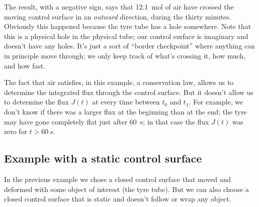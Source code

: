 \documentclass[a4paper,12pt,%
onecolumn,oneside,%
british%
]{memoir}
\renewcommand*{\|}[1][]{\nonscript\:#1\vert\nonscript\:\mathopen{}}
\newcommand*{\yti}{t_{0}}
\newcommand*{\ytf}{t_{1}}
\newcommand*{\yJ}{J}
\begin{document}
The result, with a negative sign, says that \qty{12.1}{mol} of air have crossed the moving control surface in an \emph{outward} direction, during the thirty minutes. Obviously this happened because the tyre tube has a hole somewhere. Note that this is a physical hole in the physical tube; our control surface is imaginary and doesn't have any holes. It's just a sort of \enquote{border checkpoint} where anything can in principle move through; we only keep track of what's crossing it, how much, and how fast.
%

The fact that air satisfies, in this example, a conservation law, allows us to determine the integrated flux through the control surface. But it doesn't allow us to determine the flux $\yJ(t)$ at every time between $\yti$ and $\ytf$. For example, we don't know if there was a larger flux at the beginning than at the end; the tyre may have gone completely flat just after \qty{60}{s}; in that case the flux $\yJ(t)$ was zero for $t>\qty{60}{s}$.

\subsection{Example with a static control surface}
\label{sec:example_conservation_static}

In the previous example we chose a closed control surface that moved and deformed with some object of interest (the tyre tube). But we can also choose a closed control surface that is static and doesn't follow or wrap any object.
\end{document}
